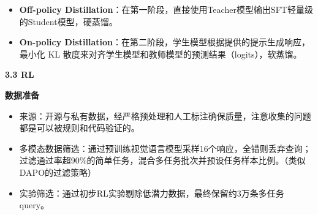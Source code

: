 \documentclass[zihao=false,fontset=windows]{ctexart}
\begin{document}
\begin{itemize}[label=\textcolor{feishuBlue}{\textbullet}]
\item \textbf{Off-policy Distillation}：在第一阶段，直接使用Teacher模型输出SFT轻量级的Student模型，硬蒸馏。

\end{itemize}

\begin{itemize}[label=\textcolor{feishuBlue}{\textbullet}]
\item \textbf{On-policy Distillation}：在第二阶段，学生模型根据提供的提示生成响应，最小化 KL 散度来对齐学生模型和教师模型的预测结果（logits），软蒸馏。

\end{itemize}


\Needspace{2cm}\par\vspace{0.9em}\begin{tcolorbox}[enhanced,colback=headOrange,boxrule=0pt,arc=4pt,boxsep=0pt,left=3pt,right=3pt,top=2pt,bottom=2pt,before skip=0pt,after skip=3pt]\bfseries \textcolor{feishuBlue}{3.3} RL\end{tcolorbox}

\Needspace{2cm}\par\vspace{0.9em}\par\vspace{0.28em}

\textbf{数据准备}\par

\begin{itemize}[label=\textcolor{feishuBlue}{\textbullet}]
\item 来源：开源与私有数据，经严格预处理和人工标注确保质量，\textcolor{feishuRed}{注意收集的问题都是可以被规则和代码验证的。}

\end{itemize}

\begin{itemize}[label=\textcolor{feishuBlue}{\textbullet}]
\item 多模态数据筛选：通过预训练视觉语言模型采样16个响应，全错则丢弃查询；过滤通过率超90\%的简单任务，混合多任务批次并预设任务样本比例。（\textcolor{feishuRed}{类似DAPO的过滤策略}）

\end{itemize}

\begin{itemize}[label=\textcolor{feishuBlue}{\textbullet}]
\item 实验筛选：通过初步RL实验剔除低潜力数据，最终保留约3万条多任务query。

\end{itemize}
\end{document}
